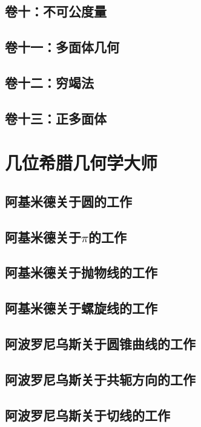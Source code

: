 \documentclass[cn,fancy,blue,11pt]{elegantbook}
\begin{document}
\section{卷十：不可公度量}

\section{卷十一：多面体几何}

\section{卷十二：穷竭法}

\section{卷十三：正多面体}

\chapter{几位希腊几何学大师}

\section{阿基米德关于圆的工作}

\section{阿基米德关于$\pi$的工作}

\section{阿基米德关于抛物线的工作}

\section{阿基米德关于螺旋线的工作}

\section{阿波罗尼乌斯关于圆锥曲线的工作}

\section{阿波罗尼乌斯关于共轭方向的工作}

\section{阿波罗尼乌斯关于切线的工作}
\end{document}
